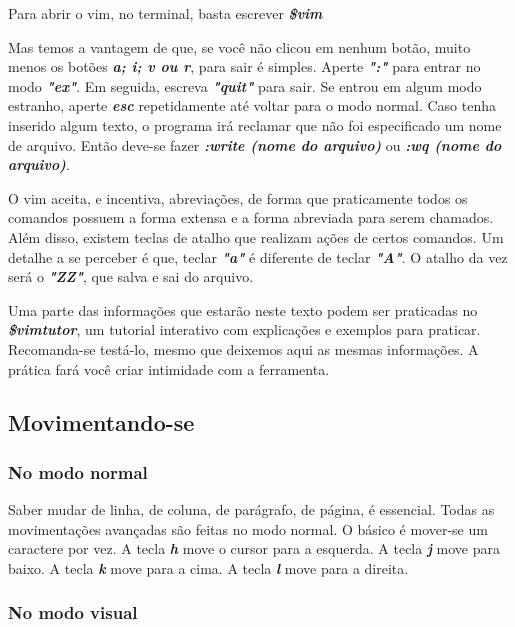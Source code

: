 \documentclass[a4paper, 12pt]{article}
\begin{document}
Para abrir o vim, no terminal, basta escrever \textbf{\textit{\$vim}}


Mas temos a vantagem de que, se você não clicou em nenhum botão, muito menos os botões \textbf{\textit{a; i; v ou r}}, para sair é simples.
Aperte \textbf{\textit{":"}} para entrar no modo \textbf{\textit{"ex"}}. Em seguida, escreva \textbf{\textit{"quit"}} para sair.
Se entrou em algum modo estranho, aperte \textbf{\textit{esc}} repetidamente até voltar para o modo normal.
Caso tenha inserido algum texto, o programa irá reclamar que não foi especificado um nome de arquivo.
Então deve-se fazer \textbf{\textit{:write (nome do arquivo)}} ou \textbf{\textit{:wq (nome do arquivo)}}.

O vim aceita, e incentiva, abreviações, de forma que praticamente todos os comandos possuem a forma extensa e a forma abreviada para serem chamados.
Além disso, existem teclas de atalho que realizam ações de certos comandos.
Um detalhe a se perceber é que, teclar \textbf{\textit{"a"}} é diferente de teclar \textbf{\textit{"A"}}.
O atalho da vez será o \textbf{\textit{"ZZ"}}, que salva e sai do arquivo.

Uma parte das informações que estarão neste texto podem ser praticadas no \textbf{\textit{\$vimtutor}}, um tutorial interativo com explicações e exemplos para praticar.
Recomanda-se testá-lo, mesmo que deixemos aqui as mesmas informações. A prática fará você criar intimidade com a ferramenta.

\subsection{Movimentando-se}
\subsubsection{No modo normal}
Saber mudar de linha, de coluna, de parágrafo, de página, é essencial.
Todas as movimentações avançadas são feitas no modo normal.
O básico é mover-se um caractere por vez.
A tecla \textbf{\textit{h}} move o cursor para a esquerda.
A tecla \textbf{\textit{j}} move para baixo.
A tecla \textbf{\textit{k}} move para a cima.
A tecla \textbf{\textit{l}} move para a direita.

\subsubsection{No modo visual}
\end{document}
